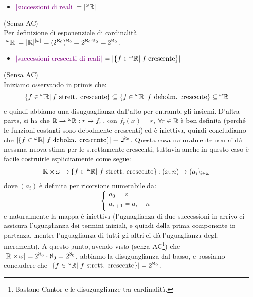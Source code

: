 \begin{itemize}
	\item \textcolor{purple}{$|$successioni di reali$|$ $= |{}^\omega \mathbb R|$}
\end{itemize}

\begin{soln}
	(Senza AC)\\
	Per definizione di esponenziale di cardinalit\`a $|{}^\omega \mathbb R| = |\mathbb R|^{|\omega|} = (2^{\aleph_0})^{\aleph_0} = 2^{\aleph_0 \cdot \aleph_0} = 2^{\aleph_0}$.
\end{soln}

\begin{itemize}
	\item \textcolor{purple}{$|$successioni crescenti di reali$|$ $= |\{f \in {}^\omega \mathbb R | \; \text{$f$ crescente}\}|$}
\end{itemize}

\begin{soln}
	(Senza AC)\\
	Iniziamo osservando in primis che:
	\[ \{f \in {}^{\omega}\mathbb R | \; \text{$f$ strett. crescente}\} \subseteq \{f \in {}^{\omega}\mathbb R | \; \text{$f$ debolm. crescente}\} \subseteq {}^{\omega}\mathbb R
		\]
	e quindi abbiamo una disuguaglianza dall'alto per entrambi gli insiemi. D'altra parte, si ha che $\mathbb R \to {}^{\omega}\mathbb R : r \mapsto f_r$, con $f_r(x) = r$, $\forall r \in \mathbb R$ \`e ben definita (perch\'e le funzioni costanti sono debolmente crescenti) ed \`e iniettiva, quindi concludiamo che 
	$|\{f \in {}^{\omega}\mathbb R | \; \text{$f$ debolm. crescente}\}| = 2^{\aleph_0}$. Questa cosa naturalmente non ci d\`a nessuna nuova stima per le strettamente crescenti, tuttavia anche in questo caso \`e facile costruirle esplicitamente come segue:
	\[ \mathbb R \times \omega \to \{f \in {}^{\omega}\mathbb R | \; \text{$f$ strett. crescente}\} : (x,n) \mapsto (a_i)_{i \in \omega}
		\]
	dove $(a_i)$ \`e definita per ricorsione numerabile da:
	\[ \begin{cases}
		a_0 = x \\
		a_{i+1} = a_i + n
	\end{cases}
		\]
	e naturalmente la mappa \`e iniettiva (l'uguaglianza di due successioni in arrivo ci assicura l'uguaglianza dei termini iniziali, e quindi della prima componente in partenza, mentre l'uguaglianza di tutti gli altri ci d\`a l'uguaglianza degli incrementi). A questo punto, avendo visto (senza AC\footnote{Bastano Cantor e le disuguaglianze tra cardinalit\`a.}) che $|\mathbb R \times \omega| = 2^{\aleph_0} \cdot \aleph_0 = 2^{\aleph_0}$,
	abbiamo la disuguaglianza dal basso, e possiamo concludere che $|\{f \in {}^{\omega}\mathbb R | \; \text{$f$ strett. crescente}\}| = 2^{\aleph_0}$.
\end{soln}

